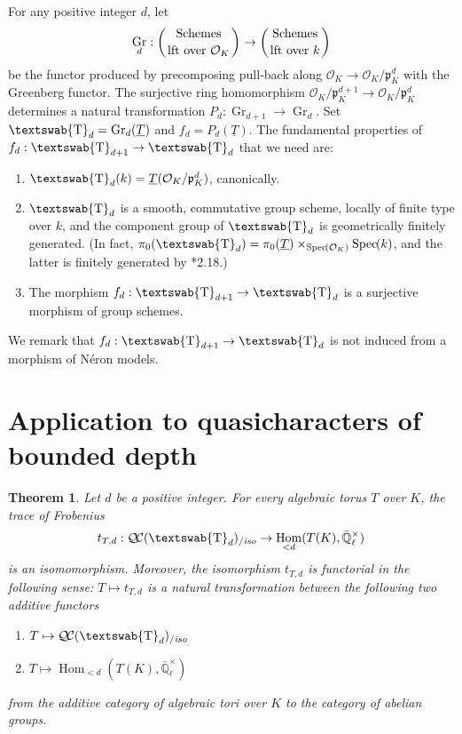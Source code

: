 \documentclass[11pt]{amsart}
\makeatletter
\newcommand{\mathswab}[1]{\operatorname{\textswab{#1}}}
\theoremstyle{plain}
\newtheorem{theorem}{Theorem}[section]
\theoremstyle{definition}
\theoremstyle{remark}
\newcommand{\Spec}[1]{{\operatorname{Spec}\hskip-1pt( #1 )}}
\newcommand{\EE}{\mathbb{\bar Q}_\ell}
\newcommand{\OK}{\mathcal{O}_K}
\newcommand{\pK}{\mathfrak{p}_K}
\newcommand{\Fq}{k}
\newcommand{\EEx}{\EE^\times}
\DeclareMathOperator{\Hom}{Hom}
\DeclareMathOperator{\Gr}{Gr}
\newcommand{\GN}[1]{\mathswab{#1}}
\newcommand{\TT}{\underline{T}}
\newcommand{\QC}{{\mathcal{Q\hskip-0.8pt C}}}
\newcommand{\QCiso}[1]{\QC(#1)_{/\textit{iso}}}
\newcommand{\trFrob}[1]{t_{#1}}
\newcommand{\labitem}[2]{%
\def\@itemlabel{\textbf{#1}}
\item
\def\@currentlabel{#1}\label{#2}}
\makeatother
\begin{document}
For any positive integer $d$, let
\[
\Gr_d : \left( \text{Schemes} \atop \text{lft over $\OK$}\right) \to \left( \text{Schemes} \atop \text{lft over $\Fq$}\right)
\]
be the functor produced by precomposing pull-back along $\OK \to \OK/\pK^d$ with the Greenberg functor.
The surjective ring homomorphism $\OK/\pK^{d+1} \to \OK/\pK^d$ determines a natural transformation $P_{d} : \Gr_{d+1} \to \Gr_d$. 
Set $\GN{T}_d = \Gr_d(\TT)$ and $f_d = P_d(\TT)$.
%
The fundamental properties of $f_d : \GN{T}_{d+1} \to \GN{T}_d$ that we need are:
 \begin{enumerate}
   \labitem{(GN.0)}{dFq} $\GN{T}_d(\Fq) = \TT(\OK/\pK^d)$, canonically.
  \labitem{(GN.1)}{GNd} $\GN{T}_d$ is a smooth, commutative group scheme,
  locally of finite type over $\Fq$, and the component group of $\GN{T}_d$ is
  geometrically finitely generated. (In fact, $\pi_0(\GN{T}_d) = \pi_0(\TT) \times_{\Spec{\OK}} \Spec{\Fq}$,
  and the latter is finitely generated by \cite{xarles:93a}*{2.18}.)
  \labitem{(GN.2)}{truncation}
  The morphism $f_d : \GN{T}_{d+1} \to \GN{T}_d$ is a surjective morphism of group schemes.
  \end{enumerate}

We remark that $f_d : \GN{T}_{d+1} \to \GN{T}_d$ is not induced from a morphism of Néron models.

\section{Application to quasicharacters of bounded depth} \label{sec:bdchar}

\begin{theorem}\label{thm:application}
Let $d$ be a positive integer.
For every algebraic torus $T$ over $K$, the trace of Frobenius 
  \[
\trFrob{T,d}:  \QCiso{\GN{T}_d} \to \Hom_{< d}(T(K),\EEx)
  \]
is an isomomorphism. 
Moreover, the isomorphism $\trFrob{T,d}$ is functorial in the following sense:
$T \mapsto \trFrob{T,d}$ is a natural transformation between the following two additive functors
\begin{enumerate}
\item[$F_1$:] $T \mapsto \QCiso{\GN{T}_d}$
\item[$F_2$:] $T \mapsto \Hom_{<d}(T(K),\EEx)$
\end{enumerate}
from the additive category of algebraic tori over $K$ to the category of abelian groups.
\end{theorem}
\end{document}
